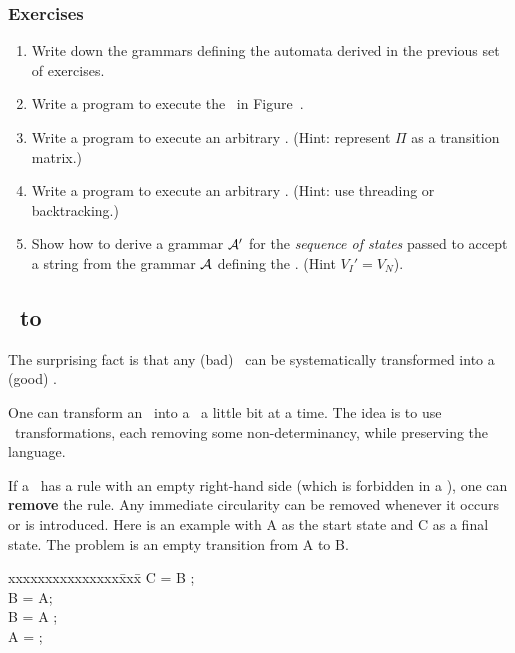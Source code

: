 \subsubsection{Exercises}
\begin{enumerate}\setcounter{enumi}{\value{RunningExercise}}

\item Write down the grammars defining the automata derived in
the previous set of exercises. 

\item Write a program to execute the \dfa\ in Figure~\thefsm.

\item  Write a program to execute an arbitrary \dfa.  
(Hint: represent $\Pi$ as a transition matrix.)

\item Write a program to execute an arbitrary \nfa.  (Hint: use
threading or backtracking.)

\item  Show how to derive a grammar $\cal A'$ for the {\em sequence of
states} passed to accept a string from the grammar $\cal A$ defining the
\fa. (Hint $V_I' = V_N$).

\setcounter{TransitionExercise}{\value{enumi}}
\setcounter{RunningExercise}{\value{enumi}}
\end{enumerate}

\subsection{\nfa\ to \dfa}

The surprising fact is that any (bad) \nfa\ can be systematically
transformed into a (good) \dfa.

One can transform an \nfa\ into a \dfa\ a little bit at a time.  
The idea is to use \cfg\ transformations, each removing some
non-determinancy, while preserving the language.

If a \nfa\ has a rule with an empty right-hand side (which is
forbidden in a \dfa), one can {\bf remove} the rule. Any immediate
circularity can be removed whenever it occurs or is introduced.  
Here is an example with A as the start state and C as a final state.
The problem is an empty transition from A to B.  

\begin{samepage}
\begin{tt}
\begin{tabbing}
xxxxxxxxxxxxxxx\=xxx\=\kill
\>C = B \sq;                 \\
\>B = A;                          \\
\>B = A \sq;                 \\
\>A = ;                           \\
\end{tabbing}
\end{tt}
\end{samepage}

